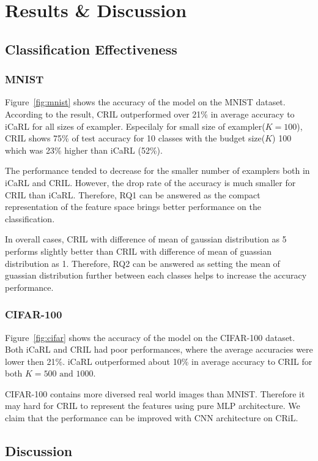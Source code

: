 \section{Results \& Discussion}
\label{sec:results}

\subsection{Classification Effectiveness}
\label{sec:results_effect}

\subsubsection{MNIST}
\label{sec:results_mnist}



Figure~\ref{fig:mnist} shows the accuracy of the model on the MNIST dataset. According to the result, CRIL outperformed over 21\% in average accuracy to iCaRL for all sizes of exampler. 
Especilaly for small size of exampler($K=100$), CRIL shows 75\% of test accuracy for 10 classes with the budget size($K$) 100 which was 23\% higher than iCaRL (52\%).

The performance tended to decrease for the smaller number of examplers both in iCaRL and CRIL. However, the drop rate of the accuracy is much smaller for CRIL than iCaRL. Therefore, RQ1 can be answered as the compact representation of the feature space brings better performance on the classification.

In overall cases, CRIL with difference of mean of gaussian distribution as 5 performs slightly better than CRIL with difference of mean of guassian distribution as 1. Therefore, RQ2 can be answered as setting the mean of guassian distribution further between each classes helps to increase the accuracy performance.

\subsubsection{CIFAR-100}
\label{sec:results_cifar}


Figure~\ref{fig:cifar} shows the accuracy of the model on the CIFAR-100 dataset. Both iCaRL and CRIL had poor performances, where the average accuracies were lower then 21\%. iCaRL outperformed about 10\% in average accuracy to CRIL for both $K=500\textrm{ and }1000$.

CIFAR-100 contains more diversed real world images than MNIST. Therefore it may hard for CRIL to represent the features using pure MLP architecture. We claim that the performance can be improved with CNN architecture on CRiL.

\subsection{Discussion}

